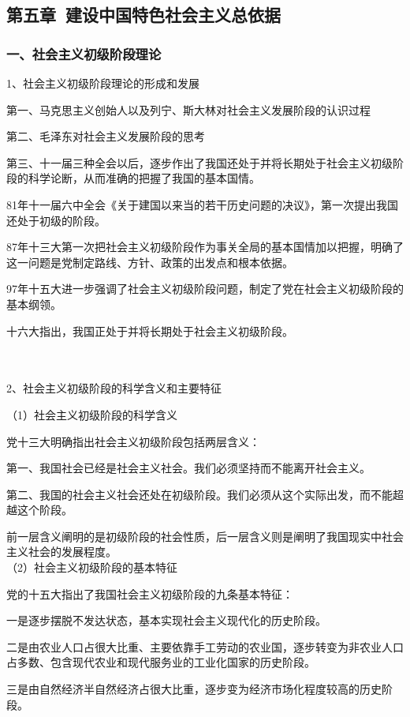 \documentclass{ctexart}
\begin{document}
\subsection{第五章\ 建设中国特色社会主义总依据}
\subsubsection{一、社会主义初级阶段理论}
1、社会主义初级阶段理论的形成和发展

第一、马克思主义创始人以及列宁、斯大林对社会主义发展阶段的认识过程

第二、毛泽东对社会主义发展阶段的思考

第三、十一届三种全会以后，逐步作出了我国还处于并将长期处于社会主义初级阶段的科学论断，从而准确的把握了我国的基本国情。

81年十一届六中全会《关于建国以来当的若干历史问题的决议》，第一次提出我国还处于初级的阶段。

87年十三大第一次把社会主义初级阶段作为事关全局的基本国情加以把握，明确了这一问题是党制定路线、方针、政策的出发点和根本依据。

97年十五大进一步强调了社会主义初级阶段问题，制定了党在社会主义初级阶段的基本纲领。

十六大指出，我国正处于并将长期处于社会主义初级阶段。



\\\\

2、社会主义初级阶段的科学含义和主要特征

（1）社会主义初级阶段的科学含义

党十三大明确指出社会主义初级阶段包括两层含义：

第一、我国社会已经是社会主义社会。我们必须坚持而不能离开社会主义。

第二、我国的社会主义社会还处在初级阶段。我们必须从这个实际出发，而不能超越这个阶段。

前一层含义阐明的是初级阶段的社会性质，后一层含义则是阐明了我国现实中社会主义社会的发展程度。
\\
（2）社会主义初级阶段的基本特征

党的十五大指出了我国社会主义初级阶段的九条基本特征：

一是逐步摆脱不发达状态，基本实现社会主义现代化的历史阶段。

二是由农业人口占很大比重、主要依靠手工劳动的农业国，逐步转变为非农业人口占多数、包含现代农业和现代服务业的工业化国家的历史阶段。

三是由自然经济半自然经济占很大比重，逐步变为经济市场化程度较高的历史阶段。
\end{document}
